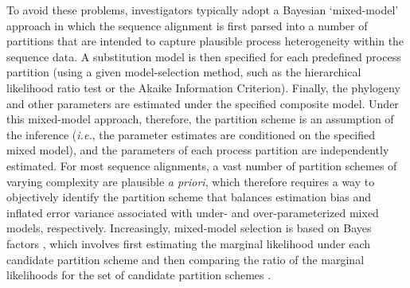 \documentclass[11pt]{article}
\begin{document}
To avoid these problems, investigators typically adopt a Bayesian `mixed-model' approach \citep[{\it e.g.},][]{ronquist03} in which the sequence alignment is first parsed into a number of partitions that are intended to capture plausible process heterogeneity within the sequence data. 
A substitution model is then specified for each predefined process partition (using a given model-selection method, such as the hierarchical likelihood ratio test or the Akaike Information Criterion).
Finally, the phylogeny and other parameters are estimated under the specified composite model.
Under this mixed-model approach, therefore, the partition scheme is an assumption of the inference ({\it i.e.}, the parameter estimates are conditioned on the specified mixed model), and the parameters of each process partition are independently estimated.
For most sequence alignments, a vast number of partition schemes of varying complexity are plausible {\it a priori}, which therefore requires a way to objectively identify the partition scheme that balances estimation bias and inflated error variance associated with under- and over-parameterized mixed models, respectively.
Increasingly, mixed-model selection is based on Bayes factors \citep[{\it e.g.},][]{suchard01}, which involves first estimating the marginal likelihood under each candidate partition scheme and then comparing the ratio of the marginal likelihoods for the set of candidate partition schemes \citep[{\it e.g.},][]{brandley05,nylander04,mcguire07}.
 
\end{document}

